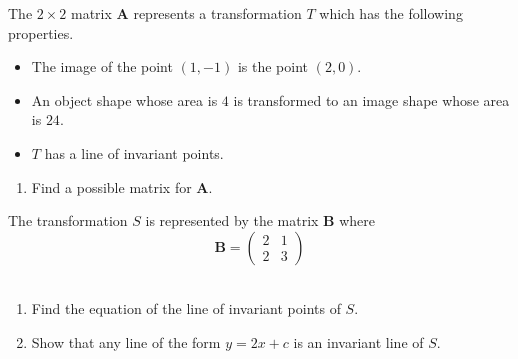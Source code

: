 \documentclass[leqno]{article}
\begin{document}
\begin{enumerate}[
  label=\textbf{\arabic*.},
  leftmargin=*,
  topsep=0pt,
  partopsep=0pt,
  parsep=0pt
]
\newpage

\questionitem

The $2 \times 2$ matrix $\mathbf{A}$ represents a transformation $T$ which has the following properties. \\

\begin{itemize}
\item The image of the point $(1,-1)$ is the point $(2,0)$.
\item An object shape whose area is $4$ is transformed to an image shape whose area is $24$.
\item $T$ has a line of invariant points. \\
\end{itemize}

\begin{enumerate}[label=\textbf{(\roman*)}]
  \item Find a possible matrix for $\mathbf{A}$.  \\
\end{enumerate}

The transformation $S$ is represented by the matrix $\mathbf{B}$ where
\[
\mathbf{B} = \begin{pmatrix}2 & 1 \\ 2 & 3\end{pmatrix}
\] \\
\begin{enumerate}[label=\textbf{(\roman*)}, resume]
  \item Find the equation of the line of invariant points of $S$.  \\
  \item Show that any line of the form $y = 2x + c$ is an invariant line of $S$.  \\
\end{enumerate}
\end{enumerate}
\end{document}
